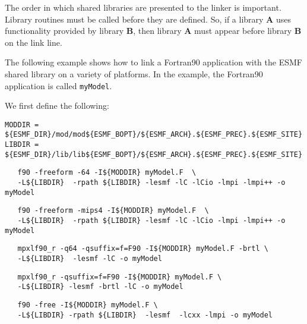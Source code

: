 The order in which shared libraries are presented to 
the linker is important. Library routines must be called before they are 
defined. So, if a library {\bf A} uses functionality provided by library 
{\bf B}, then library {\bf A} must appear before library {\bf B} on the link line. 

The following example shows how to link a Fortran90 
application with the ESMF shared library on a variety of platforms.  
In the example, the Fortran90 application is called {\tt myModel}.

\noindent We first define the following:

\begin{verbatim}
MODDIR = ${ESMF_DIR}/mod/mod${ESMF_BOPT}/${ESMF_ARCH}.${ESMF_PREC}.${ESMF_SITE}
LIBDIR = ${ESMF_DIR}/lib/lib${ESMF_BOPT}/${ESMF_ARCH}.${ESMF_PREC}.${ESMF_SITE}
\end{verbatim}


\begin{verbatim}
   f90 -freeform -64 -I${MODDIR} myModel.F  \
   -L${LIBDIR}  -rpath ${LIBDIR} -lesmf -lC -lCio -lmpi -lmpi++ -o myModel  
\end{verbatim}


\begin{verbatim}
   f90 -freeform -mips4 -I${MODDIR} myModel.F  \
   -L${LIBDIR}  -rpath ${LIBDIR} -lesmf -lC -lCio -lmpi -lmpi++ -o myModel  
\end{verbatim}


\begin{verbatim}
   mpxlf90_r -q64 -qsuffix=f=F90 -I${MODDIR} myModel.F -brtl \
   -L${LIBDIR}  -lesmf -lC -o myModel
\end{verbatim}


\begin{verbatim}
   mpxlf90_r -qsuffix=f=F90 -I${MODDIR} myModel.F \
   -L${LIBDIR} -lesmf -brtl -lC -o myModel
\end{verbatim}


\begin{verbatim}
   f90 -free -I${MODDIR} myModel.F \
   -L${LIBDIR} -rpath ${LIBDIR}  -lesmf  -lcxx -lmpi -o myModel
\end{verbatim}








